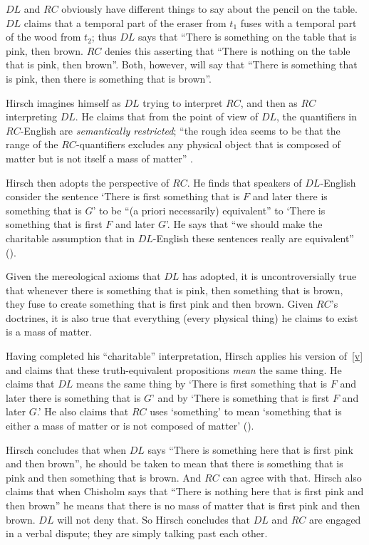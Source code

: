 \documentclass[12pt,twoside]{reedfancy}
\begin{document}
\begin{spacing}{1.25}
$DL$ and $RC$ obviously have different things to say about the pencil
on the table.  $DL$ claims that a temporal part of the eraser from
$t_{1}$ fuses with a temporal part of the wood from $t_{2}$; thus $DL$
says that ``There is something on the table that is pink, then brown.
$RC$ denies this asserting that ``There is nothing on the table that
is pink, then brown''.  Both, however, will say that ``There is
something that is pink, then there is something that is brown''.

Hirsch imagines himself as $DL$ trying to interpret $RC$, and then as
$RC$ interpreting $DL$.  He claims that from the point of view of
$DL$, the quantifiers in $RC$-English are {\em semantically
  restricted}; ``the rough idea seems to be that the range of the
$RC$-quantifiers excludes any physical object that is composed of
matter but is not itself a mass of matter'' \citep[76]{hirsch2005}.

Hirsch then adopts the perspective of $RC$.  He finds that speakers of
$DL$-English consider the sentence `There is first something that is
$F$ and later there is something that is $G$' to be ``(a priori
necessarily) equivalent'' to `There is something that is first $F$ and
later $G$'.  He says that ``we should make the charitable assumption
that in $DL$-English these sentences really are
equivalent'' (\citeyear[78]{hirsch2005}).

Given the mereological axioms that $DL$ has adopted, it is
uncontroversially true that whenever there is something that is pink,
then something that is brown, they fuse to create something that is
first pink and then brown.  Given $RC$'s doctrines, it is also
true that everything (every physical thing) he claims to exist is a
mass of matter.

Having completed his ``charitable'' interpretation, Hirsch applies his
version of~\ref{v} and claims that these truth-equivalent propositions
{\em mean} the same thing.  He claims that $DL$ means the same thing
by `There is first something that is $F$ and later there is something
that is $G$' and by `There is something that is first $F$ and later
$G$.'  He also claims that $RC$ uses `something' to mean `something
that is either a mass of matter or is not composed of matter'
(\citeyear[76]{hirsch2005}).

Hirsch concludes that when $DL$ says ``There is something here that is
first pink and then brown'', he should be taken to mean that there is
something that is pink and then something that is brown.  And $RC$ can
agree with that.  Hirsch also claims that when Chisholm says that
``There is nothing here that is first pink and then brown'' he means
that there is no mass of matter that is first pink and then
brown.  $DL$ will not deny that.  So Hirsch concludes that $DL$ and
$RC$ are engaged in a verbal dispute; they are simply talking past
each other.


\end{spacing}
\end{document}
